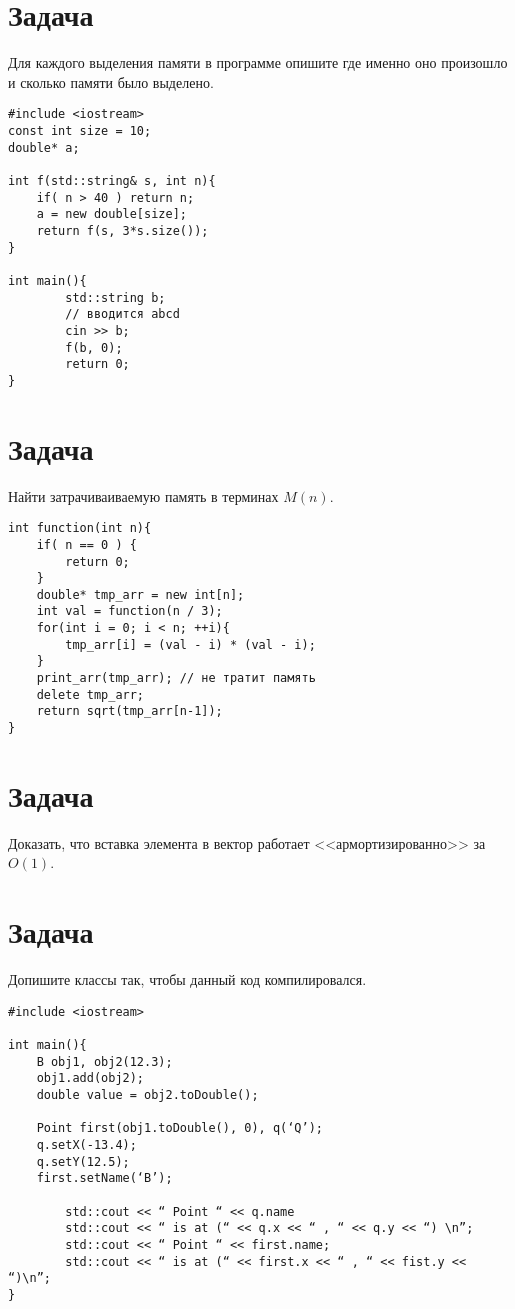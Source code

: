 \documentclass[12pt, twoside]{article}
\begin{document}
 
\section{Задача}
Для каждого выделения памяти в программе опишите где именно оно произошло и сколько памяти было выделено.

\begin{verbatim}
#include <iostream>
const int size = 10;
double* a;

int f(std::string& s, int n){
    if( n > 40 ) return n;
    a = new double[size];
    return f(s, 3*s.size());
}

int main(){
    	std::string b;
    	// вводится abcd
    	cin >> b;
    	f(b, 0);
    	return 0;
}

\end{verbatim}
\section{Задача}
Найти затрачиваиваемую память в терминах $M(n)$.
\begin{verbatim}
int function(int n){
    if( n == 0 ) {
        return 0;
    }
    double* tmp_arr = new int[n];
    int val = function(n / 3);
    for(int i = 0; i < n; ++i){
        tmp_arr[i] = (val - i) * (val - i);
    }
    print_arr(tmp_arr); // не тратит память
    delete tmp_arr;
    return sqrt(tmp_arr[n-1]);
}
\end{verbatim}
\section{Задача}
Доказать, что вставка элемента в вектор работает <<армортизированно>> за $O(1)$.

\newpage
\section{Задача}
Допишите классы так, чтобы данный код компилировался.
\begin{verbatim}
#include <iostream>

int main(){
    B obj1, obj2(12.3);
    obj1.add(obj2);
    double value = obj2.toDouble();

    Point first(obj1.toDouble(), 0), q(‘Q’);
    q.setX(-13.4);
    q.setY(12.5);
    first.setName(‘B’);

    	std::cout << “ Point “ << q.name 
    	std::cout << “ is at (“ << q.x << “ , “ << q.y << “) \n”; 
    	std::cout << “ Point “ << first.name;
    	std::cout << “ is at (“ << first.x << “ , “ << fist.y << “)\n”;
}

\end{verbatim}
\end{document}
